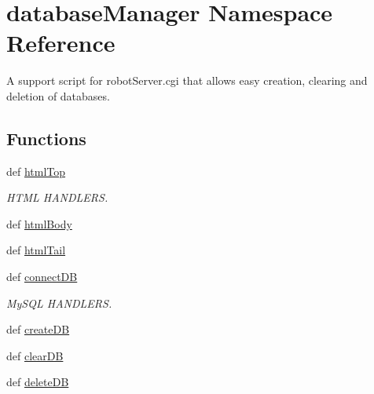 \hypertarget{namespacedatabase_manager}{\section{database\+Manager Namespace Reference}
\label{namespacedatabase_manager}
}


A support script for robot\+Server.\+cgi that allows easy creation, clearing and deletion of databases.  


\subsection*{Functions}
\begin{DoxyCompactItemize}
\item 
def \hyperlink{namespacedatabase_manager_a6758e19fddee1da7f56472341da0659e}{html\+Top}
\begin{DoxyCompactList}\small\item\em H\+T\+M\+L H\+A\+N\+D\+L\+E\+R\+S. \end{DoxyCompactList}\item 
def \hyperlink{namespacedatabase_manager_a2373da7082a77683ee44d70b07bd8e8c}{html\+Body}
\item 
def \hyperlink{namespacedatabase_manager_af6f1d18a2cc0336673043d813887d821}{html\+Tail}
\item 
def \hyperlink{namespacedatabase_manager_ad17451d5a7808225629632bc4edc5a34}{connect\+D\+B}
\begin{DoxyCompactList}\small\item\em My\+S\+Q\+L H\+A\+N\+D\+L\+E\+R\+S. \end{DoxyCompactList}\item 
def \hyperlink{namespacedatabase_manager_afad5c21c93af8199aab01624f43650cc}{create\+D\+B}
\item 
def \hyperlink{namespacedatabase_manager_a303740ad8e58858fb04dd9de5ee26b84}{clear\+D\+B}
\item 
def \hyperlink{namespacedatabase_manager_aa84a35ba6d1fdd1ef39b0ad22c629995}{delete\+D\+B}
\end{DoxyCompactItemize}
